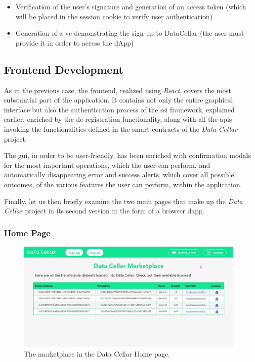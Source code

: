 \begin{itemize}
  \item Verification of the user's signature and generation of an access token (which will be placed in the session cookie to verify user authentication)
  \item Generation of a \gls{vc} demonstrating the sign-up to DataCellar (the user must provide it in order to access the dApp)
\end{itemize}

\subsection{Frontend Development}

As in the previous case, the frontend, realized using \textit{React}, covers the most substantial part of the application. It contains not only the entire graphical interface but 
also the authentication process of the \gls{ssi} framework, explained earlier, enriched by the de-registration functionality, along with all the \gls{api}s invoking the functionalities 
defined in the smart contracts of the \textit{Data Cellar} project.

The \gls{gui}, in order to be user-friendly, has been enriched with confirmation modals for the most important operations, which the user can perform, and automatically 
disappearing error and success alerts, which cover all possible outcomes, of the various features the user can perform, within the application.

Finally, let us then briefly examine the two main pages that make up the \textit{Data Cellar} project in its second version in the form of a browser \gls{dapp}. 

\subsubsection{Home Page}

\begin{figure}[h]  
  \centering
  \includegraphics[width=1\textwidth]{Images/c6_4.jpg} 
  \caption{The marketplace in the Data Cellar Home page.}
\end{figure}

